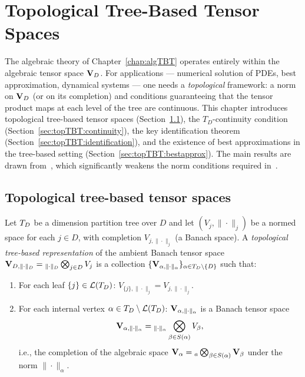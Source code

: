 %
%

\chapter{Topological Tree-Based Tensor Spaces}
\label{chap:topTBT}

The algebraic theory of Chapter~\ref{chap:algTBT} operates entirely
within the algebraic tensor space $\mathbf{V}_D$. For applications — numerical
solution of PDEs, best approximation, dynamical systems — one needs a
\emph{topological} framework: a norm on $\mathbf{V}_D$ (or on its completion)
and conditions guaranteeing that the tensor product maps at each level
of the tree are continuous. This chapter introduces topological
tree-based tensor spaces (Section~\ref{sec:topTBT:spaces}), the
$T_D$-continuity condition
(Section~\ref{sec:topTBT:continuity}), the key identification theorem
(Section~\ref{sec:topTBT:identification}), and the existence of best
approximations in the tree-based setting
(Section~\ref{sec:topTBT:bestapprox}). The main results are drawn
from~\cite{FHN2021}, which significantly weakens the norm conditions
required in~\cite{FH2012}.

\section{Topological tree-based tensor spaces}
\label{sec:topTBT:spaces}

\begin{definition}
\label{def:top_TBT_space}
Let $T_D$ be a dimension partition tree over $D$ and let
$(V_j, \|\cdot\|_j)$ be a normed space for each $j \in D$, with
completion $V_{j,\|\cdot\|_j}$ (a Banach space). A
\emph{topological tree-based representation} of the ambient Banach
tensor space $\mathbf{V}_{D,\|\cdot\|_D} = {}_{\|\cdot\|_D}\bigotimes_{j \in D} V_j$
is a collection
$\{\mathbf{V}_{\alpha,\|\cdot\|_\alpha}\}_{\alpha \in T_D \setminus \{D\}}$ such that:
\begin{enumerate}
\item[\textup{(i)}] For each leaf $\{j\} \in \mathcal{L}(T_D)$:
    $V_{\{j\},\|\cdot\|_j} = V_{j,\|\cdot\|_j}$.
\item[\textup{(ii)}] For each internal vertex $\alpha \in
    T_D \setminus \mathcal{L}(T_D)$: $\mathbf{V}_{\alpha,\|\cdot\|_\alpha}$ is a Banach tensor space
    \begin{equation}
    \label{eq:top_TBT_space}
        \mathbf{V}_{\alpha,\|\cdot\|_\alpha}
        = {}_{\|\cdot\|_\alpha}\bigotimes_{\beta \in S(\alpha)}
        V_\beta,
    \end{equation}
    i.e., the completion of the algebraic space
    $\mathbf{V}_\alpha = {}_a\bigotimes_{\beta \in S(\alpha)} \mathbf{V}_\beta$
    under the norm $\|\cdot\|_\alpha$.
\end{enumerate}
\end{definition}

